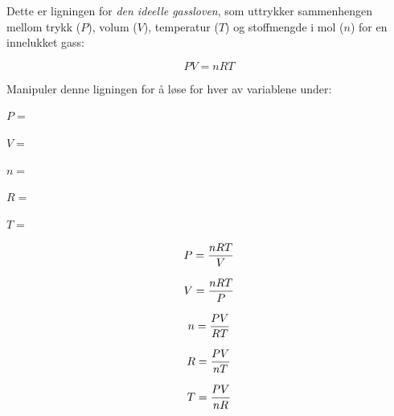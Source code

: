 

Dette er ligningen for {\it den ideelle gassloven}, som uttrykker sammenhengen mellom trykk ($P$), volum ($V$), temperatur ($T$) og stoffmengde i mol ($n$) for en innelukket gass:

$$PV = nRT$$

Manipuler denne ligningen for å løse for hver av variablene under:

\vskip 10pt

$P =$

\vskip 10pt

$V =$

\vskip 10pt

$n =$

\vskip 10pt

$R =$

\vskip 10pt

$T =$

\vskip 10pt







$$P = {nRT \over V}$$

\vskip 20pt

$$V = {nRT \over P}$$

\vskip 20pt

$$n = {PV \over RT}$$

\vskip 20pt

$$R = {PV \over nT}$$

\vskip 20pt

$$T = {PV \over nR}$$










